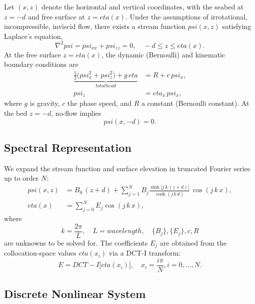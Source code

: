 \documentclass[journal,10pt,twocolumn]{IEEEtran}
\def\eta{eta}%
\def\psi{psi}%
\def\mathrm#1{#1}%
\def\text#1{#1}%
\def\;{ }%
\begin{document}
    Let $(x,z)$ denote the horizontal and vertical coordinates, with the seabed at $z=-d$ and free surface at $z=\eta(x)$. Under the assumptions of irrotational, incompressible, inviscid flow, there exists a stream function $\psi(x,z)$ satisfying Laplace's equation,
    \begin{equation}
        \nabla^2 \psi = \psi_{xx} + \psi_{zz} = 0,\quad -d \le z \le \eta(x).
    \end{equation}
    At the free surface $z=\eta(x)$, the dynamic (Bernoulli) and kinematic boundary conditions are
    \begin{align}
        \underbrace{\tfrac12\bigl(\psi_x^2 + \psi_z^2\bigr) + g\,\eta}_{\text{total head}}
        &= R + c\,\psi_x,
        \label{eq:bernoulli}\\
        \psi_z &= \eta_x\,\psi_x,
        \label{eq:kinematic}
    \end{align}
    where $g$ is gravity, $c$ the phase speed, and $R$ a constant (Bernoulli constant). At the bed $z=-d$, no-flow implies
    \begin{equation}
        \psi(x,-d)=0.
    \end{equation}

    \subsection{Spectral Representation}

    We expand the stream function and surface elevation in truncated Fourier series up to order $N$:
    \begin{align}
        \psi(x,z) &= B_0\,(z + d)
        + \sum_{j=1}^{N} B_j\;\frac{\sinh\!\bigl[j\,k\,(z + d)\bigr]}{\cosh(j\,k\,d)}
        \,\cos(j\,k\,x),
        \label{eq:psi_series}\\
        \eta(x) &= \sum_{j=0}^{N} E_j\;\cos(j\,k\,x),
        \label{eq:eta_series}
    \end{align}
    where
    \[
        k = \frac{2\pi}{L},
        \quad L = \text{wavelength},
        \quad \{B_j\},\{E_j\},c,R
    \]
    are unknowns to be solved for. The coefficients $E_j$ are obtained from the collocation-space values $\eta(x_i)$ via a DCT-I transform:
    \[
        E = \mathrm{DCT\text{-}I}\bigl[\eta(x_i)\bigr],
        \quad x_i = \frac{i\pi}{N},\; i=0,\dots,N.
    \]

    \subsection{Discrete Nonlinear System}
\end{document}
